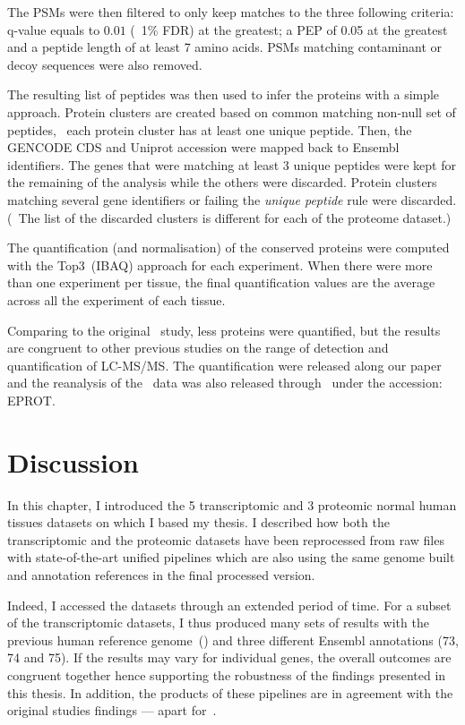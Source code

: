 The \glspl{PSM} were then filtered to only keep matches to the three following
criteria:
\gls{q-value} equals to $0.01$ (\ie\ 1\% \gls{FDR}) at the greatest; %
a \gls{PEP} of 0.05 at the greatest and
a peptide length of at least 7 amino acids.
\glspl{PSM} matching contaminant or decoy sequences were also removed.

The resulting list of peptides was then used to infer the proteins with
a simple approach.
Protein clusters are created based on common matching non-null set of peptides,
\ie\ each protein cluster has at least one unique peptide.
Then, the \gls{GENCODE} \gls{CDS} and \gls{Uniprot} accession were mapped back to
\gls{Ensembl} identifiers.
The genes that were matching at least 3 unique peptides were kept for the
remaining of the analysis while the others were discarded. Protein clusters
matching several gene identifiers or failing the \emph{unique peptide} rule were
discarded. (\NB\ The list of the discarded clusters is different for each of the
proteome dataset.)

The quantification (and normalisation) of the conserved proteins were computed
with the Top3~(\gls{IBAQ}) approach for each experiment.
When there were more than one experiment per tissue, the final quantification
values are the average across all the experiment of each tissue.

Comparing to the original \pandey\ study, less proteins were quantified, but
the results are congruent to other previous studies on the range of detection
and quantification of \gls{LC-MS/MS}. The quantification were released along
our paper~ and the reanalysis of the \pandey\ data was
also released through \egxa\ under the accession: E\textminus PROT.

\section{Discussion}

In this chapter, I introduced the 5 transcriptomic and 3 proteomic normal
human tissues datasets on which I based my thesis.
I described how both the transcriptomic and the proteomic datasets have been
reprocessed from raw files with state-of-the-art unified pipelines
which are also using the same genome built and annotation references in the
final processed version.

Indeed, I accessed the datasets through an extended period of time.
For a subset of the transcriptomic datasets,
I thus produced many sets of results with
the previous human reference genome~() and
three different \gls{Ensembl} annotations (73, 74 and 75).
If the results may vary for individual genes,
the overall outcomes are congruent together hence
supporting the robustness of the findings presented in this thesis.
In addition, the products of these pipelines are in agreement with the original
studies findings --- apart for~.

